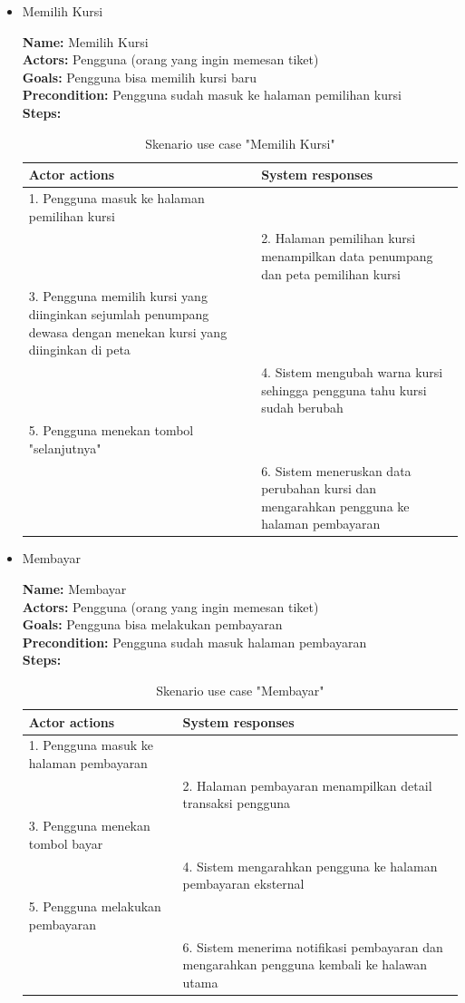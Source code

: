 \begin{itemize}
	\item Memilih Kursi
	
	\textbf{Name: }Memilih Kursi\\
	\textbf{Actors: }Pengguna (orang yang ingin memesan tiket)\\
	\textbf{Goals: }Pengguna bisa memilih kursi baru\\
	\textbf{Precondition: }Pengguna sudah masuk ke halaman pemilihan kursi\\
	\textbf{Steps: }
	\begin{table}[H]
		\centering
		\caption{Skenario use case "Memilih Kursi"}
		\label{tab:usecase4} 
		\begin{tabular}{|p{7cm}|p{7cm}|}
			\hline
			\textbf{Actor actions} & \textbf{System responses} \\ \hline
			1. Pengguna masuk ke halaman pemilihan kursi & \\
			  & 2. Halaman pemilihan kursi menampilkan data penumpang dan peta pemilihan kursi \\
			3. Pengguna memilih kursi yang diinginkan sejumlah penumpang dewasa dengan menekan kursi yang diinginkan di peta &\\ 
			  & 4. Sistem mengubah warna kursi sehingga pengguna tahu kursi sudah berubah\\
			5. Pengguna menekan tombol "selanjutnya" & \\
			  & 6. Sistem meneruskan data perubahan kursi dan mengarahkan pengguna ke halaman pembayaran\\
			\hline
		\end{tabular}
	\end{table}	
	
	\item Membayar
	
	\textbf{Name: }Membayar\\
	\textbf{Actors: }Pengguna (orang yang ingin memesan tiket)\\
	\textbf{Goals: }Pengguna bisa melakukan pembayaran\\
	\textbf{Precondition: }Pengguna sudah masuk halaman pembayaran\\
	\textbf{Steps: }
	\begin{table}[H]
		\centering
		\caption{Skenario use case "Membayar"}
		\label{tab:usecase5} 
		\begin{tabular}{|p{7cm}|p{7cm}|}
			\hline
			\textbf{Actor actions} & \textbf{System responses} \\ \hline
			1. Pengguna masuk ke halaman pembayaran & \\
			  & 2. Halaman pembayaran menampilkan detail transaksi pengguna \\
			3. Pengguna menekan tombol bayar & \\
			  & 4. Sistem mengarahkan pengguna ke halaman pembayaran eksternal\\
			5. Pengguna melakukan pembayaran & \\
			  & 6. Sistem menerima notifikasi pembayaran dan mengarahkan pengguna kembali ke halawan utama\\
			\hline
		\end{tabular}
	\end{table}	
	

\end{itemize}
